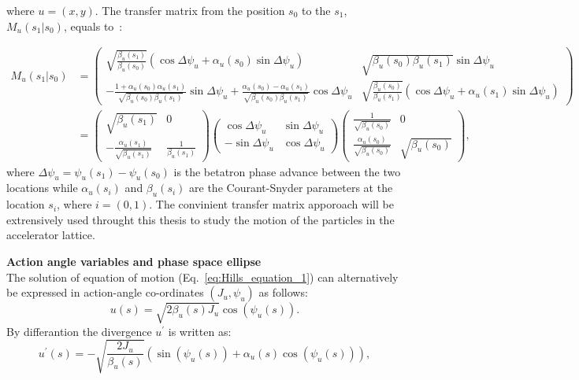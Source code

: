 where $u=(x,y)$. The transfer matrix from the position $s_0$ to the $s_1$, $M_u (s_1 |  s_0)$, equals to~\cite{Lee:1425444}: %

\begin{equation}\label{eq:linear_transfer_matrix}
    \begin{split}
    M_u (s_1 |  s_0) &= \begin{pmatrix}
        \sqrt{\frac{\beta_u(s_1)}{\beta_u(s_0)}} (\cos{\Delta \psi_u}+\alpha_u (s_0) \sin{\Delta \psi_u}) & \sqrt{\beta_u(s_0)\beta_u(s_1)}\sin{\Delta \psi_u} \\ 
         - \frac{1+\alpha_u(s_0) \alpha_u(s_1)}{\sqrt{\beta_u(s_0) \beta_u(s_1)}} \sin{\Delta \psi_u}+ \frac{\alpha_u(s_0) - \alpha_u(s_1)}{\sqrt{\beta_u(s_0) \beta_u(s_1)}} \cos{\Delta \psi_u} & \sqrt{\frac{\beta_u(s_0)}{\beta_u(s_1)}} (\cos{\Delta \psi_u}+\alpha_u(s_1) \sin{\Delta \psi_u})
        \end{pmatrix} \\ 
        &=\begin{pmatrix}
            \sqrt{\beta_u(s_1)} & 0 \\
            -\frac{\alpha_u(s_1)}{\sqrt{\beta_u(s_1)}}& \frac{1}{\beta_u(s_1)}
            \end{pmatrix} \begin{pmatrix}
            \cos{\Delta \psi_u} & \sin{\Delta \psi_u} \\
            -\sin{\Delta \psi_u}& \cos{\Delta \psi_u}
            \end{pmatrix} \begin{pmatrix}
            \frac{1}{\sqrt{\beta_u(s_0)}} & 0 \\
            \frac{\alpha_u(s_0)}{\sqrt{\beta_u(s_0)}} & \sqrt{\beta_u(s_0)}
            \end{pmatrix},
    \end{split}
\end{equation}
where $\Delta \psi_u = \psi_u(s_1)-\psi_u(s_0)$ is the betatron phase advance between the two locations while $\alpha_u(s_i)$ and $\beta_u(s_i)$ are the Courant-Snyder parameters at the location $s_i$, where $i=(0,1)$. The convinient transfer matrix apporoach will be extrensively used throught this thesis to study the motion of the particles in the accelerator lattice.

\textbf{Action angle variables and phase space ellipse}\\
The solution of equation of motion (Eq.~\eqref{eq:Hills_equation_1}) can alternatively be expressed in action-angle co-ordinates $(J_u, \psi_u)$ as follows:
\begin{equation}\label{eq:position_action_anlge}
    u(s) = \sqrt{2 \beta_u(s) J_u} \cos{(\psi_u(s))}.
\end{equation} 
By differantion the divergence $u^\prime$ is written as:
\begin{equation}\label{eq:divergence_action_anlge}
    u^\prime(s) = - \sqrt{\frac{2 J_u}{\beta_u(s)}} (\sin{(\psi_u(s))}+\alpha_u(s)\cos{(\psi_u(s))}),
\end{equation} 

